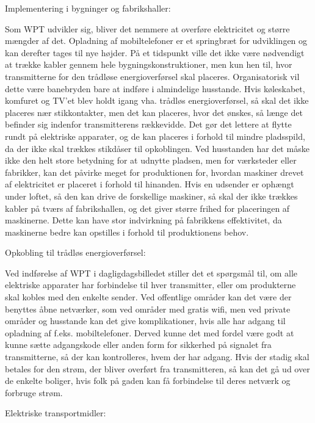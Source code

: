 Implementering i bygninger og fabrikshaller:
 	
Som WPT udvikler sig, bliver det nemmere at overføre elektricitet og større mængder af det. Opladning af mobiltelefoner er et springbræt for udviklingen og kan derefter tages til nye højder. På et tidspunkt ville det ikke være nødvendigt at trække kabler gennem hele bygningskonstruktioner, men kun hen til, hvor transmitterne for den trådløse energioverførsel skal placeres. Organisatorisk vil dette være banebryden bare at indføre i almindelige husstande. Hvis køleskabet, komfuret og TV'et blev holdt igang vha. trådløs energioverførsel, så skal det ikke placeres nær stikkontakter, men det kan placeres, hvor det ønskes, så længe det befinder sig indenfor transmitterens rækkevidde. Det gør det lettere at flytte rundt på elektriske apparater, og de kan placeres i forhold til mindre pladsspild, da der ikke skal trækkes stikdåser til opkoblingen. Ved husstanden har det måske ikke den helt store betydning for at udnytte pladsen, men for værksteder eller fabrikker, kan det påvirke meget for produktionen for, hvordan maskiner drevet af elektricitet er placeret i forhold til hinanden. Hvis en udsender er ophængt under loftet, så den kan drive de forskellige maskiner, så skal der ikke trækkes kabler på tværs af fabrikshallen, og det giver større frihed for placeringen af maskinerne. Dette kan have stor indvirkning på fabrikkens effektivitet, da maskinerne bedre kan opstilles i forhold til produktionens behov.

Opkobling til trådløs energioverførsel:
 	
Ved indførelse af WPT i dagligdagsbilledet stiller det et spørgsmål til, om alle elektriske apparater har forbindelse til hver transmitter, eller om produkterne skal kobles med den enkelte sender. Ved offentlige områder kan det være der benyttes åbne netværker, som ved områder med gratis wifi, men ved private områder og husstande kan det give komplikationer, hvis alle har adgang til opladning af f.eks. mobiltelefoner. Derved kunne det med fordel være godt at kunne sætte adgangskode eller anden form for sikkerhed på signalet fra transmitterne, så der kan kontrolleres, hvem der har adgang. Hvis der stadig skal betales for den strøm, der bliver overført fra transmitteren, så kan det gå ud over de enkelte boliger, hvis folk på gaden kan få forbindelse til deres netværk og forbruge strøm.
 
Elektriske transportmidler:
 	
